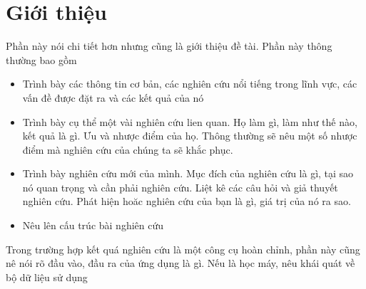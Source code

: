 \section{Giới thiệu}
\label{introduction}

Phần này nói chi tiết hơn nhưng cũng là giới thiệu đề tài. Phần này thông thường bao gồm

\begin{itemize}
    \item Trình bày các thông tin cơ bản, các nghiên cứu nổi tiếng trong lĩnh vực, các vấn đề được đặt ra và các kết quả của nó
    \item Trình bày cụ thể một vài nghiên cứu lien quan. Họ làm gì, làm như thế nào, kết quả là gì. Ưu và nhược điểm của họ. Thông thường sẽ nêu một số nhược điểm mà nghiên cứu của chúng ta sẽ khắc phục.
    \item Trình bày nghiên cứu mới của mình. Mục đích của nghiên cứu là gì, tại sao nó quan trọng và cần phải nghiên cứu. Liệt kê các câu hỏi và giả thuyết nghiên cứu. Phát hiện hoăc nghiên cứu của bạn là gì, giá trị của nó ra sao.
    \item Nêu lên cấu trúc bài nghiên cứu
\end{itemize}

Trong trường hợp kết quá nghiên cứu là một công cụ hoàn chỉnh, phần này cũng nê nói rõ đầu vào, đầu ra của ứng dụng là gì. Nếu là học máy, nêu khái quát về bộ dữ liệu sử dụng